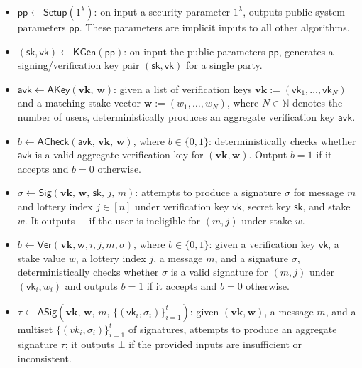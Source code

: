 \documentclass{article}
\newcommand{\sk}[0]{\mathsf{sk}}
\newcommand{\vk}[0]{\mathsf{vk}}
\begin{document}
\begin{itemize}
  \item $\mathsf{pp} \leftarrow \mathsf{Setup}(1^\lambda)$:  
        on input a security parameter $1^\lambda$, outputs public system parameters $\mathsf{pp}$.  
        These parameters are implicit inputs to all other algorithms.

  \item $(\sk,\vk) \leftarrow \mathsf{KGen}(\mathsf{pp})$:  
        on input the public parameters $\mathsf{pp}$, generates a signing/verification key pair $(\sk,\vk)$ for a single party.

  \item $\mathsf{avk} \leftarrow \mathsf{AKey}(\mathbf{vk},\, \mathbf{w})$:  
        given a list of verification keys $\mathbf{vk} := (\vk_1,\ldots,\vk_N)$ and a matching stake vector $\mathbf{w} := (w_1,\ldots,w_N)$,  
        where $N \in \mathbb{N}$ denotes the number of users, deterministically produces an aggregate verification key $\mathsf{avk}$.

  \item $b \leftarrow \mathsf{ACheck}(\mathsf{avk},\, \mathbf{vk},\, \mathbf{w})$, where $b \in \{0,1\}$:  
        deterministically checks whether $\mathsf{avk}$ is a valid aggregate verification key for $(\mathbf{vk},\mathbf{w})$. 
        Output $b = 1$ if it accepts and $b = 0$ otherwise.

  \item $\sigma \leftarrow \mathsf{Sig}(\mathbf{vk},\, \mathbf{w},\, \sk,\, j,\, m)$:  
        attempts to produce a signature $\sigma$ for message $m$ and lottery index $j \in [n]$  
        under verification key $\vk$, secret key $\sk$, and stake $w$.  
        It outputs $\bot$ if the user is ineligible for $(m,j)$ under stake $w$.

  \item $b \leftarrow \mathsf{Ver}(\mathbf{vk}, \mathbf{w}, i, j, m, \sigma)$, where $b \in \{0,1\}$:  
        given a verification key $\vk$, a stake value $w$, a lottery index $j$, a message $m$, and a signature $\sigma$,  
        deterministically checks whether $\sigma$ is a valid signature for $(m,j)$ under $(\vk_i,w_i)$  
        and outputs $b = 1$ if it accepts and $b = 0$ otherwise.

  \item $\tau \leftarrow \mathsf{ASig}(\mathbf{vk},\, \mathbf{w},\, m,\, \{(\vk_i,\sigma_i)\}_{i=1}^{t})$:  
        given $(\mathbf{vk},\mathbf{w})$, a message $m$, and a multiset $\{(vk_i,\sigma_i)\}_{i=1}^{t}$ of signatures,  
        attempts to produce an aggregate signature $\tau$; it outputs $\bot$ if the provided inputs are insufficient or inconsistent.


\end{itemize}
\end{document}
